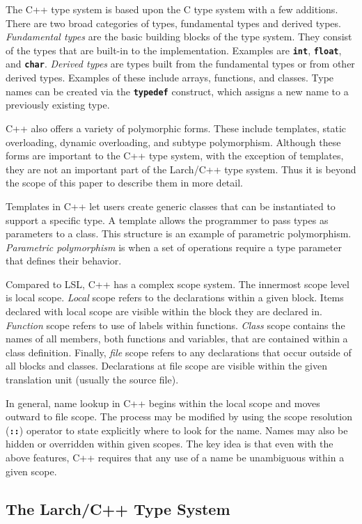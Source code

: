 \documentclass[12pt]{article} %
\newcommand{\reserved}[1]{\textbf{\texttt{#1}}} %
\begin{document}
The C++ type system is based upon the C type system with a few
additions. There are two broad categories of types, fundamental
types and derived types. \emph{Fundamental types} are the basic
building blocks of the type system. They consist of the types that are
built-in to the implementation. Examples are \reserved{int},
\reserved{float}, and \reserved{char}. \emph{Derived types} are types
built from the fundamental types or from other derived types. Examples of
these include arrays, functions, and classes. Type names can be
created via the \reserved{typedef} construct, which assigns a new name to
a previously existing type. 

C++ also offers a variety of polymorphic forms. These include
templates, static overloading, dynamic overloading, and subtype
polymorphism. Although these forms are important to the C++ type
system, with the exception of templates, they are not an important
part of the Larch/C++ type system. Thus it is beyond the scope of this
paper to describe them in more detail.

Templates in C++ let users create generic classes that can be
instantiated to support a specific type. A template allows the
programmer to pass types as parameters to a class. This structure is
an example of parametric polymorphism. \emph{Parametric polymorphism}
is when a set of operations require a type parameter that defines
their behavior.

Compared to LSL, C++ has a complex scope system. The innermost scope
level is local scope. \emph{Local} scope refers to the declarations
within a given block. Items declared with local scope are visible
within the block they are declared in. \emph{Function} scope refers to use of labels within
functions. \emph{Class} scope contains the names of all members, both
functions and variables, that are contained within a class
definition. Finally, \emph{file} scope refers to any declarations that
occur outside of all blocks and classes. Declarations at file scope
are visible within the given translation unit (usually the source
file).

In general, name lookup in C++ begins within the local scope and moves
outward to file scope. The process may be modified by using the scope
resolution (\reserved{::}) operator to state explicitly where to look for the
name. Names may also be hidden or overridden within given scopes. The
key idea is that even with the above features, C++ requires that any
use of a name be unambiguous within a given scope.

\subsection{The Larch/C++ Type System}
\label{lcppts}
\end{document}
